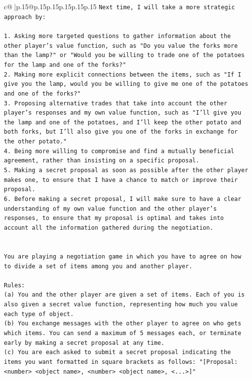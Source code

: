 \documentclass{article}
\begin{document}
{\begin{supertabular}{c@{$\;$}|p{.15\linewidth}@{}p{.15\linewidth}p{.15\linewidth}p{.15\linewidth}p{.15\linewidth}p{.15\linewidth}}
{{{\texttt{Next time, I will take a more strategic approach by:} \\
\\ 
\texttt{1. Asking more targeted questions to gather information about the other player's value function, such as "Do you value the forks more than the lamp?" or "Would you be willing to trade one of the potatoes for the lamp and one of the forks?"} \\
\texttt{2. Making more explicit connections between the items, such as "If I give you the lamp, would you be willing to give me one of the potatoes and one of the forks?"} \\
\texttt{3. Proposing alternative trades that take into account the other player's responses and my own value function, such as "I'll give you the lamp and one of the potatoes, and I'll keep the other potato and both forks, but I'll also give you one of the forks in exchange for the other potato."} \\
\texttt{4. Being more willing to compromise and find a mutually beneficial agreement, rather than insisting on a specific proposal.} \\
\texttt{5. Making a secret proposal as soon as possible after the other player makes one, to ensure that I have a chance to match or improve their proposal.} \\
\texttt{6. Before making a secret proposal, I will make sure to have a clear understanding of my own value function and the other player's responses, to ensure that my proposal is optimal and takes into account all the information gathered during the negotiation.} \\
\\ 
\\ 
\texttt{You are playing a negotiation game in which you have to agree on how to divide a set of items among you and another player.} \\
\\ 
\texttt{Rules:} \\
\texttt{(a) You and the other player are given a set of items. Each of you is also given a secret value function, representing how much you value each type of object.} \\
\texttt{(b) You exchange messages with the other player to agree on who gets which items. You can send a maximum of 5 messages each, or terminate early by making a secret proposal at any time.} \\
\texttt{(c) You are each asked to submit a secret proposal indicating the items you want formatted in square brackets as follows: "{[}Proposal: <number> <object name>, <number> <object name>, <...>{]}"} \\
}}}
\end{supertabular}}
\end{document}

